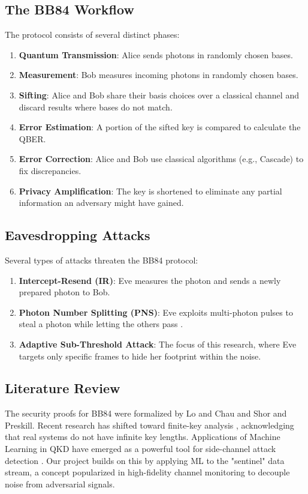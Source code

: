 \documentclass[journal,onecolumn,12pt,draftclsnofoot]{IEEEtran}
\begin{document}
\subsection{The BB84 Workflow}
The protocol consists of several distinct phases:
\begin{enumerate}
    \item \textbf{Quantum Transmission}: Alice sends photons in randomly chosen bases.
    \item \textbf{Measurement}: Bob measures incoming photons in randomly chosen bases.
    \item \textbf{Sifting}: Alice and Bob share their basis choices over a classical channel and discard results where bases do not match.
    \item \textbf{Error Estimation}: A portion of the sifted key is compared to calculate the QBER.
    \item \textbf{Error Correction}: Alice and Bob use classical algorithms (e.g., Cascade) to fix discrepancies.
    \item \textbf{Privacy Amplification}: The key is shortened to eliminate any partial information an adversary might have gained.
\end{enumerate}

\subsection{Eavesdropping Attacks}
Several types of attacks threaten the BB84 protocol:
\begin{enumerate}
    \item \textbf{Intercept-Resend (IR)}: Eve measures the photon and sends a newly prepared photon to Bob.
    \item \textbf{Photon Number Splitting (PNS)}: Eve exploits multi-photon pulses to steal a photon while letting the others pass \cite{pns}.
    \item \textbf{Adaptive Sub-Threshold Attack}: The focus of this research, where Eve targets only specific frames to hide her footprint within the noise.
\end{enumerate}

\subsection{Literature Review}
The security proofs for BB84 were formalized by Lo and Chau \cite{sifted_error} and Shor and Preskill. Recent research has shifted toward finite-key analysis \cite{finite_key}, acknowledging that real systems do not have infinite key lengths. Applications of Machine Learning in QKD have emerged as a powerful tool for side-channel attack detection \cite{ml_qkd}. Our project builds on this by applying ML to the "sentinel" data stream, a concept popularized in high-fidelity channel monitoring to decouple noise from adversarial signals.
\end{document}
